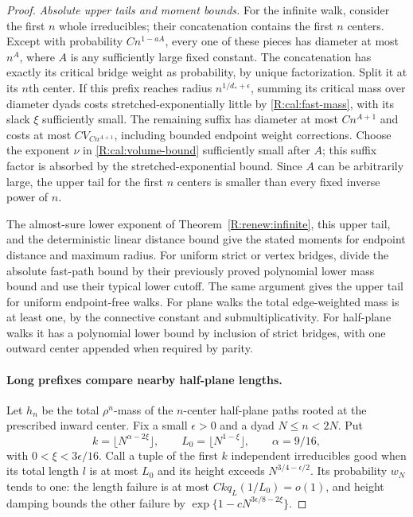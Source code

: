 \begin{proof}
\textit{Absolute upper tails and moment bounds.}
For the infinite walk, consider the first $n$ whole irreducibles; their
concatenation contains the first $n$ centers. Except with probability
$Cn^{1-aA}$, every one of these pieces has diameter at most $n^A$, where
$A$ is any sufficiently large fixed constant. The concatenation has
exactly its critical bridge weight as probability, by unique
factorization. Split it at its $n$th center. If this prefix reaches radius
$n^{1/d_*+\epsilon}$, summing its critical mass over diameter dyads costs
stretched-exponentially little by \eqref{R:cal:fast-mass}, with its slack
$\xi$ sufficiently small. The remaining suffix has diameter at most
$Cn^{A+1}$ and costs at most $CV_{Cn^{A+1}}$, including bounded endpoint
weight corrections. Choose the exponent $\nu$ in
\eqref{R:cal:volume-bound} sufficiently small after $A$; this suffix factor
is absorbed by the stretched-exponential bound. Since $A$ can be
arbitrarily large, the upper tail for the first $n$ centers is smaller
than every fixed inverse power of $n$.

The almost-sure lower exponent of Theorem~\ref{R:renew:infinite}, this
upper tail, and the deterministic linear distance bound give the stated
moments for endpoint distance and maximum radius. For uniform strict or
vertex bridges, divide the absolute fast-path bound by their previously
proved polynomial lower mass bound and use their typical lower cutoff.
The same argument gives the upper tail for uniform endpoint-free walks.
For plane walks the total edge-weighted mass is at least one, by the
connective constant and submultiplicativity. For half-plane walks it has
a polynomial lower bound by inclusion of strict bridges, with one outward
center appended when required by parity.

\paragraph{Long prefixes compare nearby half-plane lengths.}
Let $h_n$ be the total $\rho^n$-mass of the $n$-center half-plane paths
rooted at the prescribed inward center. Fix a small $\epsilon>0$ and a
dyad $N\le n<2N$. Put
\[
 k=\lfloor N^{\alpha-2\xi}\rfloor,\qquad
 L_0=\lfloor N^{1-\xi}\rfloor,\qquad \alpha=9/16,
\]
with $0<\xi<3\epsilon/16$. Call a tuple of the first $k$ independent
irreducibles good when its total length $l$ is at most $L_0$ and its
height exceeds $N^{3/4-\epsilon/2}$. Its probability $w_N$ tends to one:
the length failure is at most $Ckq_L(1/L_0)=o(1)$, and height damping
bounds the other failure by
$\exp\{1-cN^{3\epsilon/8-2\xi}\}$.


\end{proof}
